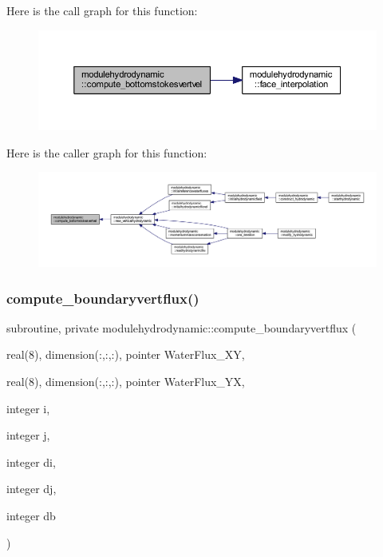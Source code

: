 Here is the call graph for this function\+:\nopagebreak
\begin{figure}[H]
\begin{center}
\leavevmode
\includegraphics[width=350pt]{namespacemodulehydrodynamic_a7cd2ef8de29d245b1298263b1facaaea_cgraph}
\end{center}
\end{figure}
Here is the caller graph for this function\+:\nopagebreak
\begin{figure}[H]
\begin{center}
\leavevmode
\includegraphics[width=350pt]{namespacemodulehydrodynamic_a7cd2ef8de29d245b1298263b1facaaea_icgraph}
\end{center}
\end{figure}
\mbox{\label{namespacemodulehydrodynamic_a6bae766b43109e13a0a6976d688327fe}} 
\subsubsection{\texorpdfstring{compute\+\_\+boundaryvertflux()}{compute\_boundaryvertflux()}}
{\footnotesize\ttfamily subroutine, private modulehydrodynamic\+::compute\+\_\+boundaryvertflux (\begin{DoxyParamCaption}\item[{real(8), dimension(\+:,\+:,\+:), pointer}]{Water\+Flux\+\_\+\+XY,  }\item[{real(8), dimension(\+:,\+:,\+:), pointer}]{Water\+Flux\+\_\+\+YX,  }\item[{integer}]{i,  }\item[{integer}]{j,  }\item[{integer}]{di,  }\item[{integer}]{dj,  }\item[{integer}]{db }\end{DoxyParamCaption})\hspace{0.3cm}{\ttfamily [private]}}

